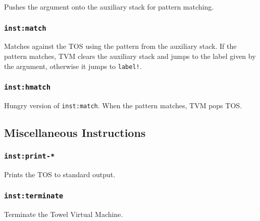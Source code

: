 \documentclass{article}
\newcommand{\inst}[1] {\texttt{inst:#1}}
\begin{document}
Pushes the argument onto the auxiliary stack for pattern matching.

\subsubsection{\inst{match}}

Matches against the TOS using the pattern from the auxiliary stack. If the pattern matches, TVM clears the auxiliary stack and jumps to the label given by the argument, otherwise it jumps to \texttt{label!}.

\subsubsection{\inst{hmatch}}

Hungry version of \inst{match}. When the pattern matches, TVM pops TOS.

\subsection{Miscellaneous Instructions}

\subsubsection{\inst{print-*}}

Prints the TOS to standard output.

\subsubsection{\inst{terminate}}

Terminate the Towel Virtual Machine.
\end{document}
